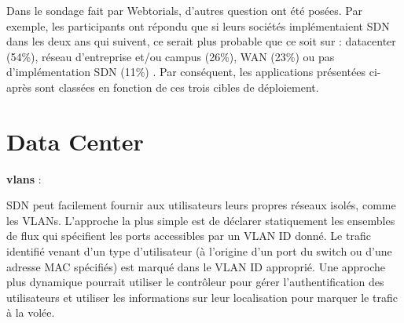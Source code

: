 Dans le sondage fait par Webtorials, d'autres question ont été posées. Par exemple, les participants ont répondu que si leurs sociétés implémentaient SDN dans les deux ans qui suivent, ce serait plus probable que ce soit sur : \gls{datacenter} (54\%), réseau d'entreprise et/ou campus (26\%), WAN (23\%) ou pas d'implémentation SDN (11\%) \cite{2013GuideSDNNVTable12}. Par conséquent, les applications présentées ci-après sont classées en fonction de ces trois cibles de déploiement.




\section{Data Center}






\textbf{\glspl{vlan}} :

SDN peut facilement fournir aux utilisateurs leurs propres réseaux isolés, comme les VLANs. L'approche la plus simple est de déclarer statiquement les ensembles de flux qui spécifient les ports accessibles par un VLAN ID donné. Le trafic identifié venant d'un type d'utilisateur (à l'origine d'un port du switch ou d'une adresse MAC spécifiés) est marqué dans le VLAN ID approprié. Une approche plus dynamique pourrait utiliser le contrôleur pour gérer l'authentification des utilisateurs et utiliser les informations sur leur localisation pour marquer le trafic à la volée. \cite{OpenFlowStanfordUsing} 




